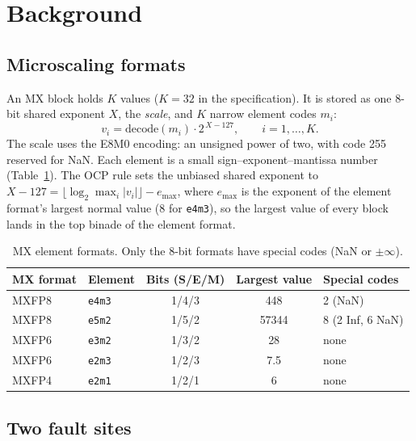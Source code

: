 \documentclass[12pt,a4paper]{article}
\newcommand{\fmt}[1]{\texttt{#1}}
\begin{document}
\section{Background}

\subsection{Microscaling formats}

An MX block holds $K$ values ($K=32$ in the specification). It is stored as one 8-bit shared
exponent $X$, the \emph{scale}, and $K$ narrow element codes $m_i$:
\begin{equation}
    v_i = \mathrm{decode}(m_i)\cdot 2^{\,X-127}, \qquad i = 1,\dots,K.
    \label{eq:mx}
\end{equation}
The scale uses the E8M0 encoding: an unsigned power of two, with code 255 reserved for NaN.
Each element is a small sign--exponent--mantissa number (Table~\ref{tab:formats}). The OCP rule
sets the unbiased shared exponent to $X - 127 = \lfloor \log_2 \max_i |v_i| \rfloor - e_{\max}$,
where $e_{\max}$ is the exponent of the element format's largest normal value (8 for
\fmt{e4m3}), so the largest value of every block lands in the top binade of the element format.

\begin{table}[H]
\centering
\caption{MX element formats. Only the 8-bit formats have special codes (NaN or $\pm\infty$).}
\label{tab:formats}
\small
\begin{tabular}{llccl}
\toprule
\textbf{MX format} & \textbf{Element} & \textbf{Bits (S/E/M)} & \textbf{Largest value} & \textbf{Special codes} \\
\midrule
MXFP8 & \fmt{e4m3} & 1/4/3 & 448    & 2 (NaN) \\
MXFP8 & \fmt{e5m2} & 1/5/2 & 57344  & 8 (2 Inf, 6 NaN) \\
MXFP6 & \fmt{e3m2} & 1/3/2 & 28     & none \\
MXFP6 & \fmt{e2m3} & 1/2/3 & 7.5    & none \\
MXFP4 & \fmt{e2m1} & 1/2/1 & 6      & none \\
\bottomrule
\end{tabular}
\end{table}

\subsection{Two fault sites}
\end{document}
